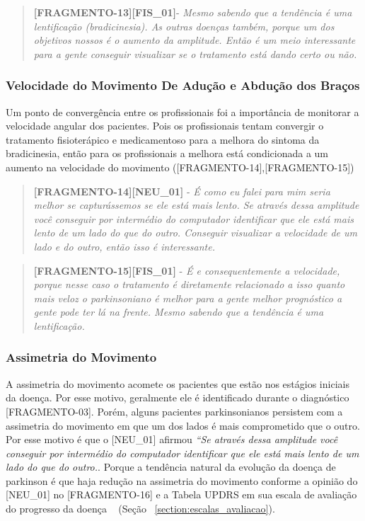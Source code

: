 \begin{quote}
\textbf{[FRAGMENTO-13][FIS\_01]}-
\emph{
Mesmo sabendo que a tendência é uma lentificação (bradicinesia).  As outras doenças também, porque um dos objetivos nossos é o aumento da amplitude. Então é um meio interessante para a gente conseguir visualizar se o tratamento está dando certo ou não.
}
\end{quote}



\subsubsection{Velocidade do Movimento De Adução e Abdução dos Braços}
Um ponto de convergência entre os profissionais foi a importância de monitorar a velocidade angular dos pacientes. Pois os profissionais tentam convergir o tratamento fisioterápico e medicamentoso para a melhora do sintoma da bradicinesia, então para os profissionais a melhora está condicionada a um aumento na velocidade do movimento ([FRAGMENTO-14],[FRAGMENTO-15])

\begin{quote}
\textbf{[FRAGMENTO-14][NEU\_01]} - 
\emph{
É como eu falei para mim seria melhor se capturássemos se ele está mais lento. Se através dessa amplitude você conseguir por intermédio do computador identificar que ele está mais lento de um lado do que do outro. Conseguir visualizar a velocidade de um lado e do outro, então isso é interessante.
}
\end{quote}


\begin{quote}
\textbf{[FRAGMENTO-15][FIS\_01]} - 
\emph{
É e consequentemente a velocidade, porque nesse caso o tratamento é diretamente relacionado a isso quanto mais veloz o parkinsoniano é melhor para a gente melhor prognóstico a gente pode ter lá na frente. Mesmo sabendo que a tendência é uma lentificação.
}
\end{quote}




\subsubsection{Assimetria do Movimento}

A assimetria do movimento acomete os pacientes que estão nos estágios iniciais da doença. Por esse motivo, geralmente ele é  identificado durante o diagnóstico [FRAGMENTO-03]. Porém, alguns pacientes parkinsonianos persistem com a assimetria do movimento em que um dos lados é mais comprometido que o outro. Por esse motivo é que o [NEU\_01] afirmou \textit{``Se através dessa amplitude você conseguir por intermédio do computador identificar que ele está mais lento de um lado do que do outro.}. Porque a tendência natural da evolução da doença de parkinson é que haja redução na assimetria do movimento conforme a opinião do [NEU\_01] no [FRAGMENTO-16] e a Tabela UPDRS em sua escala de avaliação do progresso da doença ~\cite{updrs87} (Seção ~\ref{section:escalas_avaliacao}).

